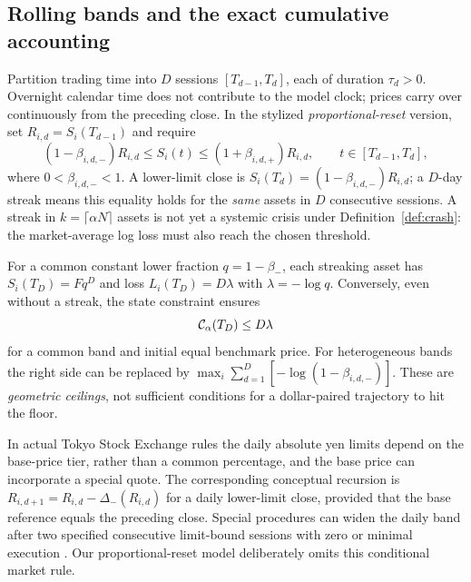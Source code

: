 \documentclass[review,hidelinks,onefignum,onetabnum]{siamonline250211}
\begin{document}
\subsection{Rolling bands and the exact cumulative accounting}\label{subsec:multiday-protocol}
Partition trading time into $D$ sessions $[T_{d-1},T_d]$, each of duration $\tau_d>0$. Overnight calendar time does not contribute to the model clock; prices carry over continuously from the preceding close. In the stylized \emph{proportional-reset} version, set $R_{i,d}=S_i(T_{d-1})$ and require
\begin{equation}\label{eq:rolling-band}
 (1-\beta_{i,d,-})R_{i,d}\le S_i(t)\le(1+\beta_{i,d,+})R_{i,d},
 \qquad t\in[T_{d-1},T_d],
\end{equation}
where $0<\beta_{i,d,-}<1$. A lower-limit close is
$S_i(T_d)=(1-\beta_{i,d,-})R_{i,d}$; a $D$-day streak means this equality holds for the \emph{same} assets in $D$ consecutive sessions. A streak in $k=\lceil\alpha N\rceil$ assets is not yet a systemic crisis under Definition~\ref{def:crash}: the market-average log loss must also reach the chosen threshold.

For a common constant lower fraction $q=1-\beta_-$, each streaking asset has
$S_i(T_D)=Fq^D$ and loss $L_i(T_D)=D\lambda$ with $\lambda=-\log q$. Conversely, even without a streak, the state constraint ensures
\begin{equation}\label{eq:rolling-cumulative-upper}
  \mathcal{C}_\alpha(T_D)\le D\lambda
\end{equation}
for a common band and initial equal benchmark price. For heterogeneous bands the right side can be replaced by
$\max_i\sum_{d=1}^D[-\log(1-\beta_{i,d,-})]$. These are \emph{geometric ceilings}, not sufficient conditions for a dollar-paired trajectory to hit the floor.

In actual Tokyo Stock Exchange rules the daily absolute yen limits depend on the base-price tier, rather than a common percentage, and the base price can incorporate a special quote. The corresponding conceptual recursion is $R_{i,d+1}=R_{i,d}-\Delta_-(R_{i,d})$ for a daily lower-limit close, provided that the base reference equals the preceding close. Special procedures can widen the daily band after two specified consecutive limit-bound sessions with zero or minimal execution \citep{JPX2026}. Our proportional-reset model deliberately omits this conditional market rule.
\end{document}

